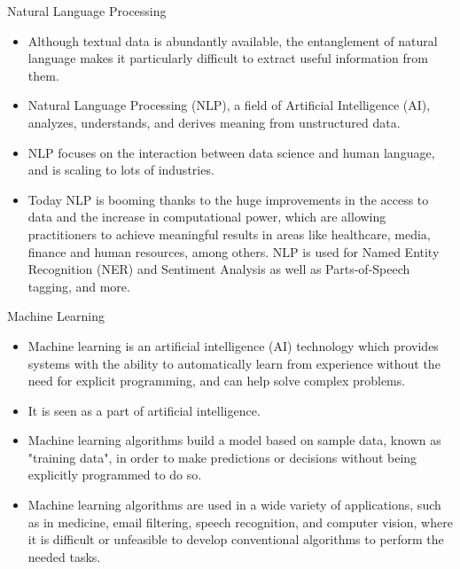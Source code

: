 \documentclass[11pt]{beamer}
\begin{document}
\begin{frame}{Natural Language Processing}
\begin{itemize}
\item Although textual data is abundantly available, the entanglement of natural language makes it particularly difficult to extract useful information from them. 

\item Natural Language Processing (NLP), a field of Artificial Intelligence (AI), analyzes, understands, and derives meaning from unstructured data. 

\item NLP focuses on the interaction between data science and human language, and is scaling to lots of industries. 

\item Today NLP is booming thanks to the huge improvements in the access to data and the increase in computational power, which are allowing practitioners to achieve meaningful results in areas like healthcare, media, finance and human resources, among others. NLP is used for Named Entity Recognition (NER) and Sentiment Analysis as well as Parts-of-Speech tagging, and more.
\end{itemize}
\end{frame}
\begin{frame}{Machine Learning}
\begin{itemize}
\item Machine learning is an artificial intelligence (AI) technology which provides systems with the ability to automatically learn from experience without the need for explicit programming, and can help solve complex problems. 

\item It is seen as a part of artificial intelligence. 

\item Machine learning algorithms build a model based on sample data, known as "training data", in order to make predictions or decisions without being explicitly programmed to do so. 

\item Machine learning algorithms are used in a wide variety of applications, such as in medicine, email filtering, speech recognition, and computer vision, where it is difficult or unfeasible to develop conventional algorithms to perform the needed tasks.
\end{itemize}
\end{frame}
\end{document}
